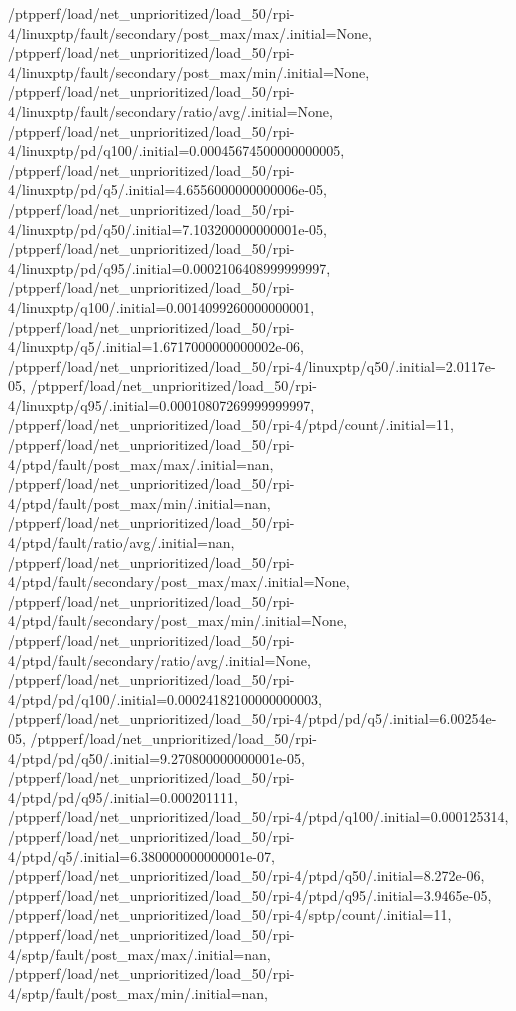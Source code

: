 {    /ptpperf/load/net_unprioritized/load_50/rpi-4/linuxptp/fault/secondary/post_max/max/.initial=None,
    /ptpperf/load/net_unprioritized/load_50/rpi-4/linuxptp/fault/secondary/post_max/min/.initial=None,
    /ptpperf/load/net_unprioritized/load_50/rpi-4/linuxptp/fault/secondary/ratio/avg/.initial=None,
    /ptpperf/load/net_unprioritized/load_50/rpi-4/linuxptp/pd/q100/.initial=0.00045674500000000005,
    /ptpperf/load/net_unprioritized/load_50/rpi-4/linuxptp/pd/q5/.initial=4.6556000000000006e-05,
    /ptpperf/load/net_unprioritized/load_50/rpi-4/linuxptp/pd/q50/.initial=7.103200000000001e-05,
    /ptpperf/load/net_unprioritized/load_50/rpi-4/linuxptp/pd/q95/.initial=0.0002106408999999997,
    /ptpperf/load/net_unprioritized/load_50/rpi-4/linuxptp/q100/.initial=0.0014099260000000001,
    /ptpperf/load/net_unprioritized/load_50/rpi-4/linuxptp/q5/.initial=1.6717000000000002e-06,
    /ptpperf/load/net_unprioritized/load_50/rpi-4/linuxptp/q50/.initial=2.0117e-05,
    /ptpperf/load/net_unprioritized/load_50/rpi-4/linuxptp/q95/.initial=0.00010807269999999997,
    /ptpperf/load/net_unprioritized/load_50/rpi-4/ptpd/count/.initial=11,
    /ptpperf/load/net_unprioritized/load_50/rpi-4/ptpd/fault/post_max/max/.initial=nan,
    /ptpperf/load/net_unprioritized/load_50/rpi-4/ptpd/fault/post_max/min/.initial=nan,
    /ptpperf/load/net_unprioritized/load_50/rpi-4/ptpd/fault/ratio/avg/.initial=nan,
    /ptpperf/load/net_unprioritized/load_50/rpi-4/ptpd/fault/secondary/post_max/max/.initial=None,
    /ptpperf/load/net_unprioritized/load_50/rpi-4/ptpd/fault/secondary/post_max/min/.initial=None,
    /ptpperf/load/net_unprioritized/load_50/rpi-4/ptpd/fault/secondary/ratio/avg/.initial=None,
    /ptpperf/load/net_unprioritized/load_50/rpi-4/ptpd/pd/q100/.initial=0.00024182100000000003,
    /ptpperf/load/net_unprioritized/load_50/rpi-4/ptpd/pd/q5/.initial=6.00254e-05,
    /ptpperf/load/net_unprioritized/load_50/rpi-4/ptpd/pd/q50/.initial=9.270800000000001e-05,
    /ptpperf/load/net_unprioritized/load_50/rpi-4/ptpd/pd/q95/.initial=0.000201111,
    /ptpperf/load/net_unprioritized/load_50/rpi-4/ptpd/q100/.initial=0.000125314,
    /ptpperf/load/net_unprioritized/load_50/rpi-4/ptpd/q5/.initial=6.380000000000001e-07,
    /ptpperf/load/net_unprioritized/load_50/rpi-4/ptpd/q50/.initial=8.272e-06,
    /ptpperf/load/net_unprioritized/load_50/rpi-4/ptpd/q95/.initial=3.9465e-05,
    /ptpperf/load/net_unprioritized/load_50/rpi-4/sptp/count/.initial=11,
    /ptpperf/load/net_unprioritized/load_50/rpi-4/sptp/fault/post_max/max/.initial=nan,
    /ptpperf/load/net_unprioritized/load_50/rpi-4/sptp/fault/post_max/min/.initial=nan,
}
